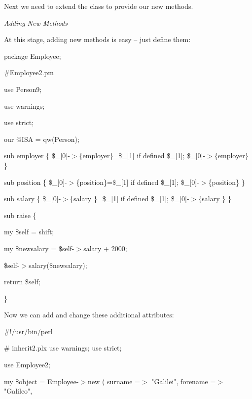 \documentclass[a4paper,11pt]{book}
\begin{document}
\noindent 

\noindent Next we need to extend the class to provide our new methods.

\noindent 

\noindent \textit{Adding New Methods}

\noindent At this stage, adding new methods is easy -- just define them:

\noindent 

\noindent 

\noindent package Employee;

\noindent \#Employee2.pm

\noindent use Person9;

\noindent use warnings;

\noindent use strict;

\noindent 

\noindent our @ISA = qw(Person);

\noindent 

\noindent sub employer \{ \$\_[0]-$>$\{employer\}=\$\_[1] if defined \$\_[1]; \$\_[0]-$>$\{employer\} \}

\noindent sub position \{ \$\_[0]-$>$\{position\}=\$\_[1] if defined \$\_[1]; \$\_[0]-$>$\{position\} \}

\noindent sub salary \{ \$\_[0]-$>$\{salary  \}=\$\_[1] if defined \$\_[1]; \$\_[0]-$>$\{salary  \} \}

\noindent 

\noindent 

\noindent sub raise \{

\noindent my \$self = shift;

\noindent my \$newsalary = \$self-$>$salary + 2000;

\noindent \$self-$>$salary(\$newsalary);

\noindent return \$self;

\noindent \}

\noindent 

\noindent Now we can add and change these additional attributes:

\noindent 

\noindent 

\noindent \#!/usr/bin/perl

\noindent \# inherit2.plx use warnings; use strict;

\noindent use Employee2;

\noindent 

\noindent my \$object = Employee-$>$new ( surname =$>$ "Galilei", forename =$>$ "Galileo",
\end{document}
